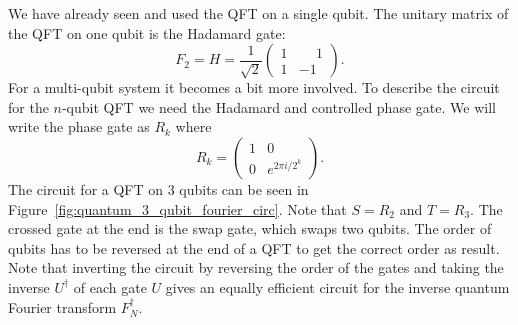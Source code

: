\documentclass[11pt, notitlepage]{report}
\newcommand{\hgate}{
  \dfrac{1}{\sqrt2}
  \begin{pmatrix}
  1 & \phantom{-}1 \\
  1 & -1
  \end{pmatrix}
}
\begin{document}
We have already seen and used the QFT on a single qubit. The unitary matrix of the QFT on one qubit is the Hadamard gate:
\begin{equation}
  F_2 = H = \hgate.
\end{equation}
For a multi-qubit system it becomes a bit more involved. To describe the circuit for the $n$-qubit QFT we need the Hadamard and controlled phase gate. We will write the phase gate as $R_k$ where
\begin{equation}
  R_k = \begin{pmatrix}
    1 & 0 \\
    0 & e^{2\pi i/2^k}
  \end{pmatrix}.
\end{equation}
The circuit for a QFT on 3 qubits can be seen in Figure~\ref{fig:quantum_3_qubit_fourier_circ}. Note that $S = R_2$ and $T = R_3$. The crossed gate at the end is the swap gate, which swaps two qubits. The order of qubits has to be reversed at the end of a QFT to get the correct order as result. Note that inverting the circuit by reversing the order of the gates and taking the inverse $U^\dagger$ of each gate $U$ gives an equally efficient circuit for the inverse quantum Fourier transform $F_N^\dagger$.
\end{document}
